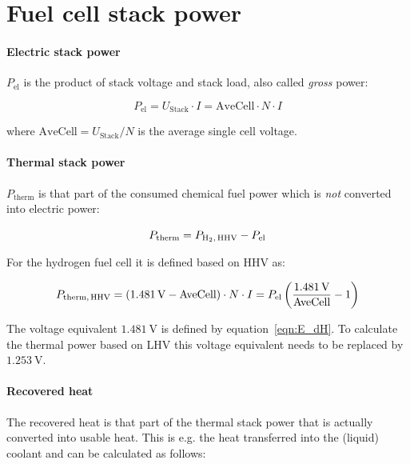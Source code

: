 \documentclass[11pt,a4paper,english,twoside]{scrreprt}
\begin{document}
\section{Fuel cell stack power}


\paragraph{Electric stack power}

$P_{\text{el}}$ is the product of stack voltage and stack load, also called \textit{gross} power:

\begin{equation}
  \label{eqn:P_gross}
   P_{\text{el}} =U_{\text{Stack}} \cdot I = \text{AveCell} \cdot N \cdot I
\end{equation}

where $\text{AveCell} = U_{\text{Stack}} / N$ is the average single cell voltage.


\paragraph{Thermal stack power}

$P_{\text{therm}}$ is that part of the consumed chemical fuel power which is \textit{not} converted into electric power:

\[
	P_{\text{therm}} = P_{\ce{H2},\,\text{HHV}} - P_{\text{el}}
\]

For the hydrogen fuel cell it is defined based on HHV as:

\begin{equation}
  \label{eqn:P_therm}
  P_{\text{therm,\,HHV}} =\left(\SI{1.481}{\volt} - {\text{AveCell}}\right) \cdot N \cdot I = P_{\text{el}} \left(\frac{\SI{1.481}{\volt}}{\text{AveCell}} - 1\right)
\end{equation}

The voltage equivalent $\SI{1.481}{\volt}$ is defined by equation~\ref{eqn:E_dH}. To calculate the thermal power based on LHV this voltage equivalent needs to be replaced by $\SI{1.253}{\volt}$.


\paragraph{Recovered heat}

The recovered heat is that part of the thermal stack power that is actually converted into usable heat. This is e.g. the heat transferred into the (liquid) coolant and can be calculated as follows:
\end{document}
